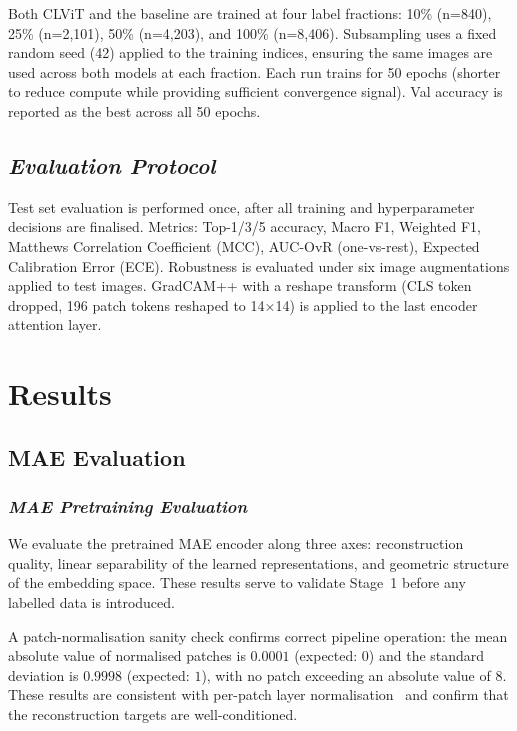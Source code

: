 \documentclass[conference]{IEEEtran}
\begin{document}
Both CLViT and the baseline are trained at four label fractions: 10\% (n=840), 25\% (n=2,101), 50\% (n=4,203), and 100\% (n=8,406). Subsampling uses a fixed random seed (42) applied to the training indices, ensuring the same images are used across both models at each fraction. Each run trains for 50 epochs (shorter to reduce compute while providing sufficient convergence signal). Val accuracy is reported as the best across all 50 epochs.

\subsection{\textit{Evaluation Protocol}}

Test set evaluation is performed once, after all training and hyperparameter decisions are finalised. Metrics: Top-1/3/5 accuracy, Macro F1, Weighted F1, Matthews Correlation Coefficient (MCC), AUC-OvR (one-vs-rest), Expected Calibration Error (ECE). Robustness is evaluated under six image augmentations applied to test images. GradCAM++ with a reshape transform (CLS token dropped, 196 patch tokens reshaped to 14×14) is applied to the last encoder attention layer.

\section{Results}

\subsection{MAE Evaluation}

\subsubsection{\textit{\textbf{MAE Pretraining Evaluation}}}

We evaluate the pretrained MAE encoder along three axes: reconstruction quality, linear separability of the learned representations, and geometric structure of the embedding space. These results serve to validate Stage~1 before any labelled data is introduced.

A patch-normalisation sanity check confirms correct pipeline operation: the mean absolute value of normalised patches is $0.0001$ (expected: $0$) and the standard deviation is $0.9998$ (expected: $1$), with no patch exceeding an absolute value of $8$. These results are consistent with per-patch layer normalisation~\cite{1} and confirm that the reconstruction targets are well-conditioned.
\end{document}
